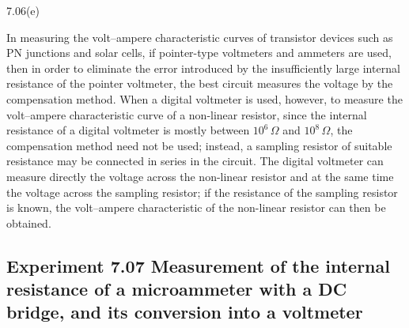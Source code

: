 \begin{figbox}{7.06(e)}
\end{figbox}

\begin{commentary}
In measuring the volt--ampere characteristic curves of transistor devices such as PN junctions and solar cells, if pointer-type voltmeters and ammeters are used, then in order to eliminate the error introduced by the insufficiently large internal resistance of the pointer voltmeter, the best circuit measures the voltage by the compensation method. When a digital voltmeter is used, however, to measure the volt--ampere characteristic curve of a non-linear resistor, since the internal resistance of a digital voltmeter is mostly between $10^{6}\,\Omega$ and $10^{8}\,\Omega$, the compensation method need not be used; instead, a sampling resistor of suitable resistance may be connected in series in the circuit. The digital voltmeter can measure directly the voltage across the non-linear resistor and at the same time the voltage across the sampling resistor; if the resistance of the sampling resistor is known, the volt--ampere characteristic of the non-linear resistor can then be obtained.
\end{commentary}

\subsection*{Experiment 7.07 \quad Measurement of the internal resistance of a microammeter with a DC bridge, and its conversion into a voltmeter}

